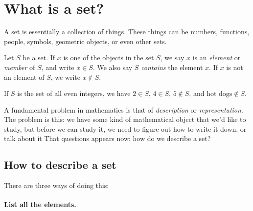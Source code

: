 \documentclass{tufte-book}
\begin{document}
\section{What is a set?}
\label{sec:what-set}

A set is essentially a collection of things. These things can be numbers, functions, people, symbols, geometric objects, or even other sets. 

\begin{definition}
  Let $S$ be a set. If $x$ is one of the objects in the set $S$, we say $x$ is an \emph{element} or \emph{member} of $S$, and write $x \in S$. We also say $S$ \emph{contains} the element $x$. If $x$ is not an element of $S$, we write $x \notin S$.
\end{definition}

If $S$ is the set of all even integers, we have $2 \in S$, $4 \in S$, $5 \notin S$, and $\text{hot dogs} \notin S$.

A fundamental problem in mathematics is that of \emph{description} or \emph{representation}. The problem is this: we have some kind of mathematical object that we'd like to study, but before we can study it, we need to figure out how to write it down, or talk about it That questions appears now: how do we describe a set?

\subsection{How to describe a set}
\label{sec:how-describe-set}

There are three ways of doing this:

\paragraph{List all the elements.}
\label{sec:list-all-elements}
\end{document}

